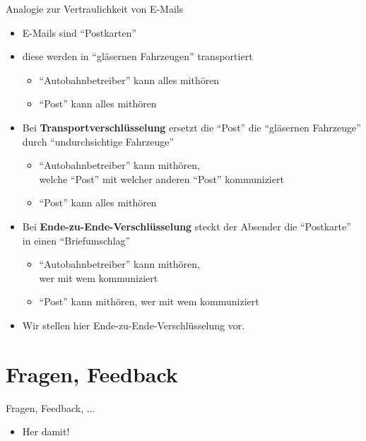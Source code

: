   \begin{frame}{Analogie zur Vertraulichkeit von E-Mails}
    \begin{itemize}
      \item E-Mails sind ``Postkarten''
      \item diese werden in ``gläsernen Fahrzeugen'' transportiert
      \begin{itemize}
        \item ``Autobahnbetreiber'' kann alles mithören
        \item ``Post'' kann alles mithören
      \end{itemize}
      \item Bei \textbf{Transportverschlüsselung} ersetzt die ``Post'' die ``gläsernen Fahrzeuge'' durch ``undurchsichtige Fahrzeuge''
      \begin{itemize}
        \item ``Autobahnbetreiber'' kann mithören,\\welche ``Post'' mit welcher anderen ``Post'' kommuniziert
        \item ``Post'' kann alles mithören
      \end{itemize}
      \item Bei \textbf{Ende-zu-Ende-Verschlüsselung} steckt der Absender die ``Postkarte'' in einen ``Briefumschlag''
      \begin{itemize}
        \item ``Autobahnbetreiber'' kann mithören,\\wer mit wem kommuniziert
        \item ``Post'' kann mithören, wer mit wem kommuniziert
      \end{itemize}
      \item Wir stellen hier Ende-zu-Ende-Verschlüsselung vor.
    \end{itemize}
  \end{frame}
\section{Fragen, Feedback}
  \begin{frame}{Fragen, Feedback, ...}
    \begin{itemize}
      \item{Her damit!}
    \end{itemize}
  \end{frame}

